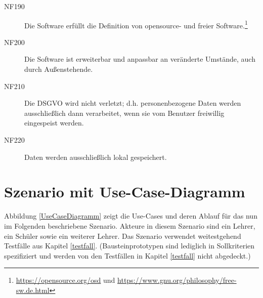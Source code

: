 \documentclass[parskip=full]{scrartcl}
\begin{document}
\begin{description}

\item[NF190] Die Software erfüllt die Definition von \gls{opensource}- und freier Software.\footnote{\url{https://opensource.org/osd} und \url{https://www.gnu.org/philosophy/free-sw.de.html}}
\item[NF200] Die Software ist erweiterbar und anpassbar an veränderte Umstände, auch durch Außenstehende.
\item[NF210] Die \gls{DSGVO} wird nicht verletzt; d.h. personenbezogene Daten werden ausschließlich dann verarbeitet, wenn sie vom Benutzer freiwillig eingespeist werden.
\item[NF220] Daten werden ausschließlich lokal gespeichert.

\end{description}

\clearpage
\section{Szenario mit Use-Case-Diagramm}\label{scenario}

Abbildung \ref{UseCaseDiagramm} zeigt die Use-Cases und deren Ablauf für das nun im Folgenden beschriebene Szenario. Akteure in diesem Szenario sind ein Lehrer, ein Schüler sowie ein weiterer Lehrer. Das Szenario verwendet weitestgehend Testfälle aus Kapitel \ref{testfall}. (Bausteinprototypen sind lediglich in Sollkriterien spezifiziert und werden von den Testfällen in Kapitel \ref{testfall} nicht abgedeckt.)
\end{document}
